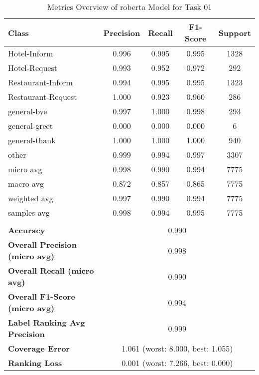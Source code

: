 \begin{table}[H]
\centering

\begin{tabular}{|l|c|c|c|c|}
\hline
\textbf{Class}& \textbf{Precision} & \textbf{Recall} & \textbf{F1-Score} & \textbf{Support} \\ \hline
Hotel-Inform & 0.996 & 0.995 & 0.995 & 1328 \\ \hline
Hotel-Request & 0.993 & 0.952 & 0.972 & 292 \\ \hline
Restaurant-Inform & 0.994 & 0.995 & 0.995 & 1323 \\ \hline
Restaurant-Request & 1.000 & 0.923 & 0.960 & 286 \\ \hline
general-bye & 0.997 & 1.000 & 0.998 & 293 \\ \hline
general-greet & 0.000 & 0.000 & 0.000 & 6 \\ \hline
general-thank & 1.000 & 1.000 & 1.000 & 940 \\ \hline
other & 0.999 & 0.994 & 0.997 & 3307 \\ \hline\hline
micro avg & 0.998 & 0.990 & 0.994 & 7775 \\ \hline
macro avg & 0.872 & 0.857 & 0.865 & 7775 \\ \hline
weighted avg & 0.997 & 0.990 & 0.994 & 7775 \\ \hline
samples avg & 0.998 & 0.994 & 0.995 & 7775 \\ \hline
\multicolumn{5}{c}{}\\ \hline

\textbf{Accuracy}                    & \multicolumn{4}{c|}{0.990}                                 \\ \hline
\textbf{Overall Precision (micro avg)}           & \multicolumn{4}{c|}{0.998}                                \\ \hline
\textbf{Overall Recall (micro avg)}              & \multicolumn{4}{c|}{0.990}                                   \\ \hline
\textbf{Overall F1-Score (micro avg)}            & \multicolumn{4}{c|}{0.994}                                  \\ \hline
\textbf{Label Ranking Avg Precision} & \multicolumn{4}{c|}{0.999}                                    \\ \hline
\textbf{Coverage Error}              & \multicolumn{4}{c|}{1.061 (worst: 8.000, best: 1.055)}                             \\ \hline
\textbf{Ranking Loss}                & \multicolumn{4}{c|}{0.001 (worst: 7.266, best: 0.000)}                             \\ \hline
\end{tabular}

\caption{Metrics Overview of roberta Model for Task 01}
\label{table:roberta_metrics_task_01}
\end{table}
    